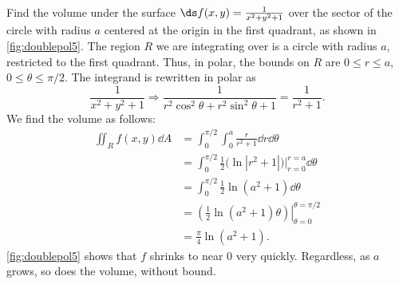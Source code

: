 
\begin{example}\label{ex_doublepol5}%
Find the volume under the surface $\ds f(x,y) =\frac1{x^2+y^2+1}$ over the  sector of the circle with radius $a$ centered at the origin in the first quadrant, as shown in \autoref{fig:doublepol5}.
\solution
The region $R$ we are integrating over is a circle with radius $a$, restricted to the first quadrant. Thus, in polar, the bounds on $R$ are $0\leq r\leq a$, $0\leq\theta\leq\pi/2$. The integrand is rewritten in polar as 
\[
\frac{1}{x^2+y^2+1} \Rightarrow
\frac{1}{r^2\cos^2\theta+r^2\sin^2\theta+1} = \frac1{r^2+1}.
\]
We find the volume as follows:
\begin{align*}
\iint_Rf(x,y)\dd A &= \int_0^{\pi/2}\int_0^a\frac{r}{r^2+1}\dd r\dd\theta\\
		&= \int_0^{\pi/2} \frac12\bigl(\ln|r^2+1|\bigr)\Big|_{r=0}^{r=a}\dd\theta\\
		&=\int_0^{\pi/2} \frac12\ln(a^2+1)\dd\theta\\
		&= \left.\left(\frac12\ln(a^2+1)\theta\right)\right|_{\theta=0}^{\theta=\pi/2}\\
		&= \frac{\pi}{4}\ln(a^2+1).
\end{align*}
\autoref{fig:doublepol5}  shows that $f$ shrinks to near 0 very quickly. Regardless, as $a$ grows, so does the volume, without bound. 
\end{example}

